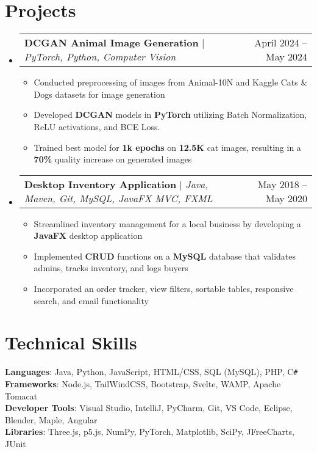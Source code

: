 \documentclass[letterpaper,11pt]{article}
\makeatletter
\newcommand{\resumeItem}[1]{
  \item\small{
    {#1 \vspace{-2pt}}
  }
}
\newcommand{\resumeProjectHeading}[2]{
    \item
    \begin{tabular*}{0.97\textwidth}{l@{\extracolsep{\fill}}r}
      \small#1 & #2 \\
    \end{tabular*}\vspace{-7pt}
}
\newcommand{\resumeSubHeadingListStart}{\begin{itemize}[leftmargin=0.15in, label={}]}
\newcommand{\resumeSubHeadingListEnd}{\end{itemize}}
\newcommand{\resumeItemListStart}{\begin{itemize}}
\newcommand{\resumeItemListEnd}{\end{itemize}\vspace{-5pt}}
\makeatother
\begin{document}
\section{Projects}
    \resumeSubHeadingListStart
      \resumeProjectHeading
          {\textbf{DCGAN Animal Image Generation} $|$ \emph{PyTorch, Python, Computer Vision}}{April 2024 -- May 2024}
          \resumeItemListStart
            
            \resumeItem{Conducted preprocessing of images from Animal-10N and Kaggle Cats \& Dogs datasets for image generation}
            \resumeItem{Developed \textbf{DCGAN} models in \textbf{PyTorch} utilizing Batch Normalization, ReLU activations, and BCE Loss.}
            \resumeItem{Trained best model for \textbf{1k epochs} on \textbf{12.5K} cat images, resulting in a \textbf{70\%} quality increase on generated images}
          \resumeItemListEnd
      \resumeProjectHeading
          {\textbf{Desktop Inventory Application} $|$ \emph{Java, Maven, Git, MySQL, JavaFX MVC, FXML}}{May 2018 -- May 2020}
          \resumeItemListStart
            \resumeItem{Streamlined inventory management for a local business by developing a \textbf{JavaFX} desktop application}
            \resumeItem{Implemented \textbf{CRUD} functions on a \textbf{MySQL} database that validates admins, tracks inventory, and logs buyers}
            \resumeItem{Incorporated an order tracker, view filters, sortable tables, responsive search, and email functionality}

          \resumeItemListEnd
    \resumeSubHeadingListEnd



%
\section{Technical Skills}
 \begin{itemize}[leftmargin=0.15in, label={}]
    \small{\item{
     \textbf{Languages}{: Java, Python, JavaScript, HTML/CSS, SQL (MySQL), PHP, C\texttt{\#}} \\
     \textbf{Frameworks}{: Node.js, TailWindCSS, Bootstrap, Svelte, WAMP, Apache Tomacat} \\
     \textbf{Developer Tools}{: Visual Studio, IntelliJ, PyCharm, Git, VS Code, Eclipse, Blender, Maple, Angular} \\
     \textbf{Libraries}{: Three.js, p5.js, NumPy, PyTorch, Matplotlib, SciPy, JFreeCharts, JUnit}
    }}
 \end{itemize}


\end{document}
